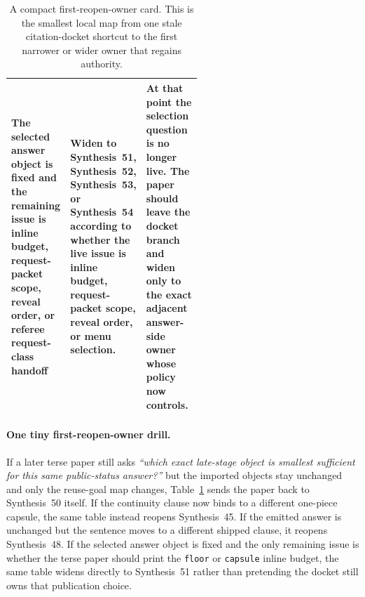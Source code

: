 \documentclass[11pt]{article}
\begin{document}
\begin{table}[t]
\begin{tabularx}{\linewidth}{@{}p{0.31\linewidth}p{0.23\linewidth}X@{}}
The selected answer object is fixed and the remaining issue is inline budget, request-packet scope, reveal order, or referee request-class handoff & Widen to Synthesis~51, Synthesis~52, Synthesis~53, or Synthesis~54 according to whether the live issue is inline budget, request-packet scope, reveal order, or menu selection. & At that point the selection question is no longer live. The paper should leave the docket branch and widen only to the exact adjacent answer-side owner whose policy now controls. \\
\bottomrule
\end{tabularx}
\caption{A compact first-reopen-owner card. This is the smallest local map from one stale citation-docket shortcut to the first narrower or wider owner that regains authority.}
\label{tab:first-reopen-owner-card-answer-citation-docket}
\end{table}

\paragraph{One tiny first-reopen-owner drill.}
If a later terse paper still asks \emph{``which exact late-stage object is smallest sufficient for this same public-status answer?''} but the imported objects stay unchanged and only the reuse-goal map changes, Table~\ref{tab:first-reopen-owner-card-answer-citation-docket} sends the paper back to Synthesis~50 itself. If the continuity clause now binds to a different one-piece capsule, the same table instead reopens Synthesis~45. If the emitted answer is unchanged but the sentence moves to a different shipped clause, it reopens Synthesis~48. If the selected answer object is fixed and the only remaining issue is whether the terse paper should print the \nolinkurl{floor} or \nolinkurl{capsule} inline budget, the same table widens directly to Synthesis~51 rather than pretending the docket still owns that publication choice.\cite{series:workedexample}
\end{document}
